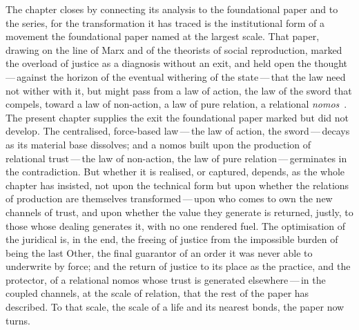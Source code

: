 The chapter closes by connecting its analysis to the foundational paper and to the series, for the transformation it has traced is the institutional form of a movement the foundational paper named at the largest scale. That paper, drawing on the line of Marx and of the theorists of social reproduction, marked the overload of justice as a diagnosis without an exit, and held open the thought\,---\,against the horizon of the eventual withering of the state\,---\,that the law need not wither with it, but might pass from a law of action, the law of the sword that compels, toward a law of non-action, a law of pure relation, a relational \emph{nomos}~\parencite{wanhong_grb,marx1976}. The present chapter supplies the exit the foundational paper marked but did not develop. The centralised, force-based law\,---\,the law of action, the sword\,---\,decays as its material base dissolves; and a nomos built upon the production of relational trust\,---\,the law of non-action, the law of pure relation\,---\,germinates in the contradiction. But whether it is realised, or captured, depends, as the whole chapter has insisted, not upon the technical form but upon whether the relations of production are themselves transformed\,---\,upon who comes to own the new channels of trust, and upon whether the value they generate is returned, justly, to those whose dealing generates it, with no one rendered fuel. The optimisation of the juridical is, in the end, the freeing of justice from the impossible burden of being the last Other, the final guarantor of an order it was never able to underwrite by force; and the return of justice to its place as the practice, and the protector, of a relational nomos whose trust is generated elsewhere\,---\,in the coupled channels, at the scale of relation, that the rest of the paper has described. To that scale, the scale of a life and its nearest bonds, the paper now turns.
